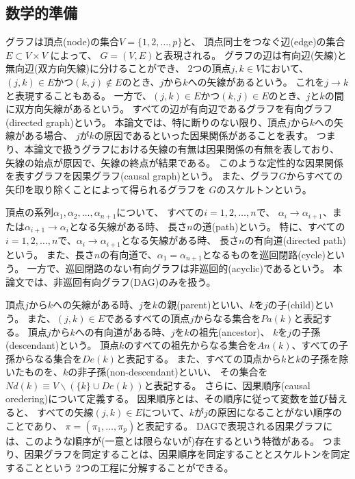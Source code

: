 
\subsection{数学的準備}

グラフは頂点(node)の集合$V=\{1,2,\dots,p\}$と、
頂点同士をつなぐ辺(edge)の集合$E\subset V \times V$ によって、
$G=(V,E)$と表現される。
グラフの辺は有向辺(矢線)と無向辺(双方向矢線)に分けることができ、
2つの頂点$j,k\in V$において、
$(j,k)\in E$かつ$(k,j)\notin E$のとき、$j$から$k$への矢線があるという。
これを$j \rightarrow k$と表現することもある。
一方で、$(j,k)\in E$かつ$(k,j)\in E$のとき、$j$と$k$の間に双方向矢線があるという。
すべての辺が有向辺であるグラフを有向グラフ(directed graph)という。
本論文では、特に断りのない限り、頂点$j$から$k$への矢線がある場合、
$j$が$k$の原因であるといった因果関係があることを表す。
つまり、本論文で扱うグラフにおける矢線の有無は因果関係の有無を表しており、
矢線の始点が原因で、矢線の終点が結果である。
このような定性的な因果関係を表すグラフを因果グラフ(causal graph)という。
また、グラフ$G$からすべての矢印を取り除くことによって得られるグラフを
$G$のスケルトンという。

頂点の系列$\alpha_1, \alpha_2, \dots, \alpha_{n+1}$について、
すべての$i=1,2,\dots, n$で、
$\alpha_i \rightarrow \alpha_{i+1}$、または$\alpha_{i+1} \rightarrow \alpha_i$となる矢線がある時、
長さ$n$の道(path)という。
特に、すべての$i=1,2,\dots, n$で、$\alpha_i \rightarrow \alpha_{i+1}$となる矢線がある時、
長さ$n$の有向道(directed path)という。
また、長さ$n$の有向道で、$\alpha_1 = \alpha_{n+1}$となるものを巡回閉路(cycle)という。
一方で、巡回閉路のない有向グラフは非巡回的(acyclic)であるという。
本論文では、非巡回有向グラフ(DAG)のみを扱う。

頂点$j$から$k$への矢線がある時、$j$を$k$の親(parent)といい、$k$を$j$の子(child)という。
また、$(j,k)\in E$であるすべての頂点$j$からなる集合を$Pa(k)$と表記する。
頂点$j$から$k$への有向道がある時、$j$を$k$の祖先(ancestor)、
$k$を$j$の子孫(descendant)という。
頂点$k$のすべての祖先からなる集合を$An(k)$、すべての子孫からなる集合を$De(k)$と表記する。
また、すべての頂点から$k$と$k$の子孫を除いたものを、$k$の非子孫(non-descendant)といい、
その集合を$\mathit{Nd}(k) \equiv V \backslash (\{k \} \cup De(k))$と表記する。
さらに、因果順序(causal oredering)について定義する。
因果順序とは、その順序に従って変数を並び替えると、
すべての矢線$(j,k)\in E$について、$k$が$j$の原因になることがない順序のことであり、
$\pi =(\pi_1, \dots, \pi_p)$と表記する。
DAGで表現される因果グラフには、このような順序が(一意とは限らないが)存在するという特徴がある。
つまり、因果グラフを同定することは、因果順序を同定することとスケルトンを同定することという
2つの工程に分解することができる。

